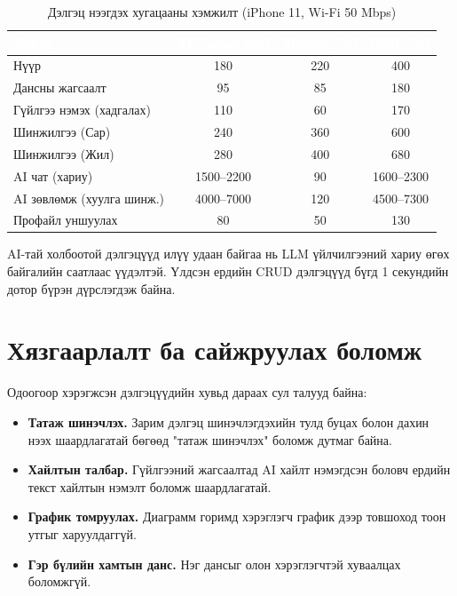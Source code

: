 \begin{table}[ht]
\centering
\footnotesize
\renewcommand{\arraystretch}{1.25}
\begin{tabular}{|p{4.5cm}|c|c|c|}
\hline
\rowcolor{darknavy}
\textcolor{white}{\textbf{Дэлгэц}} & \textcolor{white}{\textbf{API хариу (мс)}} & \textcolor{white}{\textbf{Дүрслэл (мс)}} & \textcolor{white}{\textbf{Нийт (мс)}} \\ \hline
Нүүр                       & 180 & 220 & 400 \\ \hline
Дансны жагсаалт            & 95  & 85  & 180 \\ \hline
Гүйлгээ нэмэх (хадгалах)   & 110 & 60  & 170 \\ \hline
Шинжилгээ (Сар)            & 240 & 360 & 600 \\ \hline
Шинжилгээ (Жил)            & 280 & 400 & 680 \\ \hline
AI чат (хариу)             & 1500--2200 & 90 & 1600--2300 \\ \hline
AI зөвлөмж (хуулга шинж.)  & 4000--7000 & 120 & 4500--7300 \\ \hline
Профайл уншуулах           & 80  & 50  & 130 \\ \hline
\end{tabular}
\caption{Дэлгэц нээгдэх хугацааны хэмжилт (iPhone 11, Wi-Fi 50 Mbps)}
\label{tab:perf}
\end{table}

AI-тай холбоотой дэлгэцүүд илүү удаан байгаа нь LLM үйлчилгээний хариу өгөх байгалийн саатлаас үүдэлтэй. Үлдсэн ердийн CRUD дэлгэцүүд бүгд 1 секундийн дотор бүрэн дүрслэгдэж байна.

\section{Хязгаарлалт ба сайжруулах боломж}
Одоогоор хэрэгжсэн дэлгэцүүдийн хувьд дараах сул талууд байна:
\begin{itemize}
    \item \textbf{Татаж шинэчлэх.} Зарим дэлгэц шинэчлэгдэхийн тулд буцах болон дахин нээх шаардлагатай бөгөөд "татаж шинэчлэх" боломж дутмаг байна.
    \item \textbf{Хайлтын талбар.} Гүйлгээний жагсаалтад AI хайлт нэмэгдсэн боловч ердийн текст хайлтын нэмэлт боломж шаардлагатай.
    \item \textbf{График томруулах.} Диаграмм горимд хэрэглэгч график дээр товшоход тоон утгыг харуулдаггүй.
    \item \textbf{Гэр бүлийн хамтын данс.} Нэг дансыг олон хэрэглэгчтэй хуваалцах боломжгүй.
\end{itemize}

